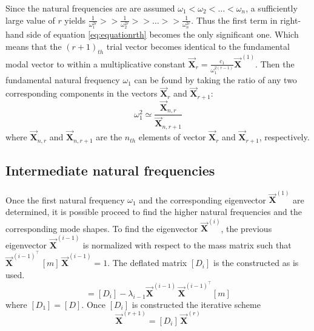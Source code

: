 Since the natural frequencies are are assumed \(\omega_1 < \omega_2 < \dots <
\omega_n\), a sufficiently large value of \(r\) yields \(\frac{1}{\omega_1^{2r}}
>> \frac{1}{\omega_2^{2r}} >> \dots >> \frac{1}{\omega_n^{2r}}\). Thus the first
term in right-hand side of equation \eqref{eq:equationrth} becomes the only
significant one.
Which means that the \((r+1)_{th}\) trial vector becomes identical to the
fundamental modal vector to within a multiplicative constant
\(\vec{\mathbf{X}}_{r} = \frac{c_1}{\omega^{2(r-1)}_{1}}\vec{\mathbf{X}}^{(1)}\).
Then the fundamental natural frequency \(\omega_1\) can be found by taking the
ratio of any two corresponding components in the vectors \(\vec{\mathbf{X}}_{r}\)
and \(\vec{\mathbf{X}}_{r+1}\):
\begin{equation}
  \omega_1^{2} \simeq \frac{\vec{\mathbf{X}}_{n,r}}{\vec{\mathbf{X}}_{n,r+1}}
\end{equation}
where \(\vec{\mathbf{X}}_{n,r}\) and \(\vec{\mathbf{X}}_{n,r+1}\) are the
\(n_{th}\) elements of vector \(\vec{\mathbf{X}}_{r}\) and
\(\vec{\mathbf{X}}_{r+1}\), respectively.
\subsection{Intermediate natural frequencies}
Once the first natural frequency \(\omega_1\) and the corresponding eigenvector
\(\vec{\mathbf{X}}^{(1)}\) are determined, it is possible proceed to find the
higher natural frequencies and the corresponding mode shapes.
To find the eigenvector \(\vec{\mathbf{X}}^{(i)}\), the previous eigenvector
\(\vec{\mathbf{X}}^{(i-1)}\) is normalized with respect to the mass matrix such
that \(\vec{\mathbf{X}}^{(i-1)^\top}\,[m]\,\vec{\mathbf{X}}^{(i-1)} = 1\).
The deflated matrix \([D_i]\) is the constructed as is used.
\begin{equation}
  [D_i] =
  [D_i] - \lambda_{i-1}\vec{\mathbf{X}}^{(i-1)}\,\vec{\mathbf{X}}^{(i-1)^\top}[m]
\end{equation}
where \([D_1] = [D]\).
Once \([D_i]\) is constructed the iterative scheme
\begin{equation}
  \vec{\mathbf{X}}^{(r+1)} = [D_i]\,\vec{\mathbf{X}}^{(r)}
\end{equation}
%
